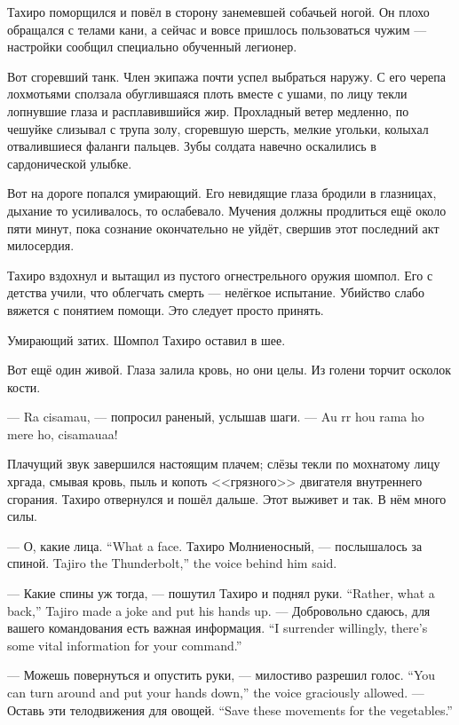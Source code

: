 Тахиро поморщился и повёл в сторону занемевшей собачьей ногой.
Он плохо обращался с телами кани, а сейчас и вовсе пришлось пользоваться чужим --- настройки сообщил специально обученный легионер.

Вот сгоревший танк.
Член экипажа почти успел выбраться наружу.
С его черепа лохмотьями сползала обуглившаяся плоть вместе с ушами, по лицу текли лопнувшие глаза и расплавившийся жир.
Прохладный ветер медленно, по чешуйке слизывал с трупа золу, сгоревшую шерсть, мелкие угольки, колыхал отвалившиеся фаланги пальцев.
Зубы солдата навечно оскалились в сардонической улыбке.

Вот на дороге попался умирающий.
Его невидящие глаза бродили в глазницах, дыхание то усиливалось, то ослабевало.
Мучения должны продлиться ещё около пяти минут, пока сознание окончательно не уйдёт, свершив этот последний акт милосердия.

Тахиро вздохнул и вытащил из пустого огнестрельного оружия шомпол.
Его с детства учили, что облегчать смерть --- нелёгкое испытание.
Убийство слабо вяжется с понятием помощи.
Это следует просто принять.

Умирающий затих.
Шомпол Тахиро оставил в шее.

Вот ещё один живой.
Глаза залила кровь, но они целы.
Из голени торчит осколок кости.

--- Ra cisamau, --- попросил раненый, услышав шаги.
--- Au rr hou rama ho mere ho, cisamauaa\FM!

Плачущий звук завершился настоящим плачем;
слёзы текли по мохнатому лицу хргада, смывая кровь, пыль и копоть <<грязного>> двигателя внутреннего сгорания.
Тахиро отвернулся и пошёл дальше.
Этот выживет и так.
В нём много силы.

{--- О, какие лица.}
{``What a face.}
{Тахиро Молниеносный, --- послышалось за спиной.}
{Tajiro the Thunderbolt,'' the voice behind him said.}

{--- Какие спины уж тогда, --- пошутил Тахиро и поднял руки.}
{``Rather, what a back,'' Tajiro made a joke and put his hands up.}
{--- Добровольно сдаюсь, для вашего командования есть важная информация.}
{``I surrender willingly, there's some vital information for your command.''}

{--- Можешь повернуться и опустить руки, --- милостиво разрешил голос.}
{``You can turn around and put your hands down,'' the voice graciously allowed.}
{--- Оставь эти телодвижения для овощей\FM.}
{``Save these movements for the vegetables\FM.''}


